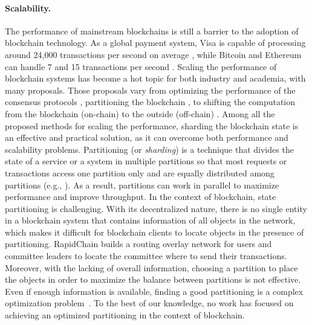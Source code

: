 \paragraph*{Scalability.} The performance of mainstream blockchains is still a
barrier to the adoption of blockchain technology. As a global payment system,
Visa is capable of processing around 24,000 transactions per second on average
\cite{visa}, while Bitcoin and Ethereum can handle 7 and 15 transactions per
second \cite{ethereum:sharding, nakamoto2019bitcoin}. Scaling the performance of
blockchain systems has become a hot topic for both industry and academia, with
many proposals. Those proposals vary from optimizing the performance of the
consensus protocols \cite{dang2019towards}, partitioning the blockchain
\cite{wang2019sok}, to shifting the computation from the blockchain (on-chain)
to the outside (off-chain) \cite{teutsch2019scalable, network2018cheap}. Among
all the proposed methods for scaling the performance, sharding the blockchain state
is an effective and practical solution, as it can overcome both performance and
scalability problems. Partitioning (or \emph{sharding}) is a
technique that divides the state of a service or a system in multiple partitions
so that most requests or transactions access one partition only and are equally
distributed among partitions (e.g., \cite{facebookTAO, sciascia2012sdur,
aguilera2007sinfonia}). As a result, partitions can work in parallel to maximize
performance and improve throughput. In the context of blockchain, state
partitioning is challenging.
With its decentralized nature, there is no single entity in a blockchain system that
contains information of all objects in the network, which makes it difficult for
blockchain clients to locate objects in the presence of partitioning. RapidChain
\cite{zamani2018rapidchain} builds a routing overlay network for users and
committee leaders to locate the committee where to send their transactions.
Moreover, with the lacking of overall information, choosing a partition to place
the objects in order to maximize the balance between partitions is not
effective. Even if enough information is available, finding a good partitioning
is a complex optimization problem~\cite{curino2010sch,taft2014est}. To the best
of our knowledge, no work has focused on achieving an optimized partitioning in the
context of blockchain.

